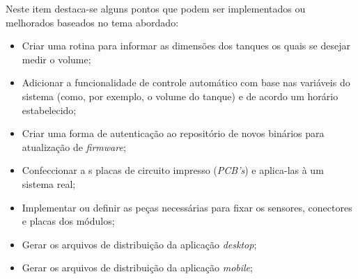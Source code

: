 Neste item destaca-se alguns pontos que podem ser implementados ou melhorados baseados no tema abordado:

\begin{itemize}
\item Criar uma rotina para informar as dimensões dos tanques os quais se desejar medir o volume;
\item Adicionar a funcionalidade de controle automático com base nas variáveis do sistema (como, por exemplo, o volume do tanque) e de acordo um horário estabelecido;
\item Criar uma forma de autenticação ao repositório de novos binários para atualização de \textit{firmware};
\item Confeccionar a
s placas de circuito impresso (\textit{PCB's}) e aplica-las à um sistema real;
\item Implementar ou definir as peças necessárias para fixar os sensores, conectores e placas dos módulos; 
\item Gerar os arquivos de distribuição da aplicação \textit{desktop};
\item Gerar os arquivos de distribuição da aplicação \textit{mobile};
\end{itemize}
